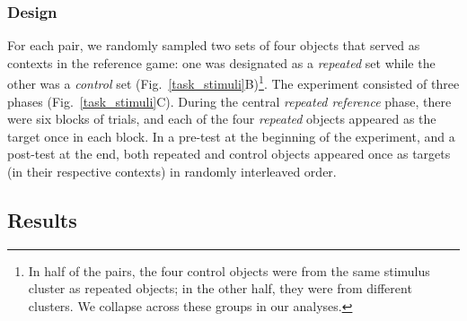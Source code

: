 \documentclass[10pt,letterpaper]{article}
\begin{document}


\subsubsection{Design} 
For each pair, we randomly sampled two sets of four objects that served as contexts in the reference game: one was designated as a \emph{repeated} set while the other was a \emph{control} set (Fig.~\ref{task_stimuli}B)\footnote{In half of the pairs, the four control objects were from the same stimulus cluster as repeated objects; in the other half, they were from different clusters. We collapse across these groups in our analyses.}.%
The experiment consisted of three phases (Fig.~\ref{task_stimuli}C).
During the central \textit{repeated reference} phase, there were six blocks of trials, and each of the four \emph{repeated} objects appeared as the target once in each block.
In a pre-test at the beginning of the experiment, and a post-test at the end, both repeated and control objects appeared once as targets (in their respective contexts) in randomly interleaved order. 

\subsection{Results}
\end{document}
